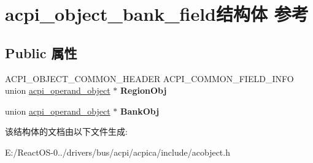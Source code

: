 \hypertarget{structacpi__object__bank__field}{}\section{acpi\+\_\+object\+\_\+bank\+\_\+field结构体 参考}
\label{structacpi__object__bank__field}
\subsection*{Public 属性}
\begin{DoxyCompactItemize}
\item 
\mbox{\label{structacpi__object__bank__field_a46dab661eec4014335b9349cb0ef6a96}} 
A\+C\+P\+I\+\_\+\+O\+B\+J\+E\+C\+T\+\_\+\+C\+O\+M\+M\+O\+N\+\_\+\+H\+E\+A\+D\+ER A\+C\+P\+I\+\_\+\+C\+O\+M\+M\+O\+N\+\_\+\+F\+I\+E\+L\+D\+\_\+\+I\+N\+FO union \hyperlink{unionacpi__operand__object}{acpi\+\_\+operand\+\_\+object} $\ast$ {\bfseries Region\+Obj}
\item 
\mbox{\label{structacpi__object__bank__field_a73ed4dfbc43c06d12943e619cb7628fa}} 
union \hyperlink{unionacpi__operand__object}{acpi\+\_\+operand\+\_\+object} $\ast$ {\bfseries Bank\+Obj}
\end{DoxyCompactItemize}


该结构体的文档由以下文件生成\+:\begin{DoxyCompactItemize}
\item 
E\+:/\+React\+O\+S-\/0../drivers/bus/acpi/acpica/include/acobject.\+h\end{DoxyCompactItemize}
